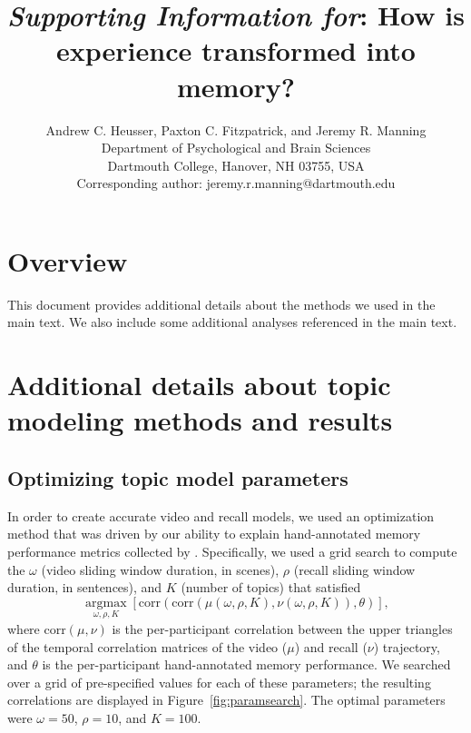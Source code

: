 \documentclass{article}
\title{\textit{Supporting Information for}: How is experience transformed into memory?}
\author{Andrew C. Heusser, Paxton C. Fitzpatrick, and Jeremy R. Manning\\Department of Psychological and Brain Sciences\\Dartmouth College, Hanover, NH 03755, USA\\Corresponding author: jeremy.r.manning@dartmouth.edu}
\newcommand{\argmax}{\mathop{\mathrm{argmax}}\limits}
\begin{document}
\maketitle

\setcounter{equation}{0}
\setcounter{figure}{0}
\setcounter{table}{0}
\setcounter{page}{1}
\setcounter{section}{0}
\makeatletter
\renewcommand{\theequation}{S\arabic{equation}}
\renewcommand{\thefigure}{S\arabic{figure}}
\renewcommand{\bibnumfmt}[1]{[S#1]}
\renewcommand{\citenumfont}[1]{S#1}


\section*{Overview}
This document provides additional details about the methods we used in the main text.  We also include some additional analyses referenced in the main text.

\section*{Additional details about topic modeling methods and results}
\subsection*{Optimizing topic model parameters}
In order to create accurate video and recall models, we used an optimization method that was driven by our ability to explain hand-annotated memory performance metrics collected by \cite{ChenEtal17}.  Specifically, we used a grid search to compute the $\omega$ (video sliding window duration, in scenes), $\rho$ (recall sliding window duration, in sentences), and $K$ (number of topics) that satisfied
\[
\argmax_{\omega, \rho, K} \left[\mathrm{corr}\left(\mathrm{corr}\left(\mu\left(\omega, \rho, K\right), \nu\left(\omega, \rho, K\right)\right), \theta\right)\right],
\]
where $\mathrm{corr}(\mu, \nu)$ is the per-participant correlation between the upper triangles of the temporal correlation matrices of the video ($\mu$) and recall ($\nu$) trajectory, and $\theta$ is the per-participant hand-annotated memory performance.  We searched over a grid of pre-specified values for each of these parameters; the resulting correlations are displayed in Figure~\ref{fig:paramsearch}.  The optimal parameters were $\omega = 50$, $\rho = 10$, and $K = 100$.
\end{document}
